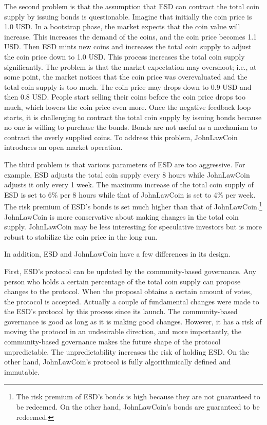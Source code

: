 \documentclass[dvipdfmx,a4paper]{article}
\begin{document}
The second problem is that the assumption that ESD can contract the total coin supply by issuing bonds is questionable. Imagine that initially the coin price is 1.0 USD. In a bootstrap phase, the market expects that the coin value will increase. This increases the demand of the coins, and the coin price becomes 1.1 USD. Then ESD mints new coins and increases the total coin supply to adjust the coin price down to 1.0 USD. This process increases the total coin supply significantly. The problem is that the market expectation may overshoot; i.e., at some point, the market notices that the coin price was overevaluated and the total coin supply is too much. The coin price may drops down to 0.9 USD and then 0.8 USD. People start selling their coins before the coin price drops too much, which lowers the coin price even more. Once the negative feedback loop starts, it is challenging to contract the total coin supply by issuing bonds because no one is willing to purchase the bonds. Bonds are not useful as a mechanism to contract the overly supplied coins. To address this problem, JohnLawCoin introduces an open market operation.

The third problem is that various parameters of ESD are too aggressive. For example, ESD adjusts the total coin supply every 8 hours while JohnLawCoin adjusts it only every 1 week. The maximum increase of the total coin supply of ESD is set to 6\% per 8 hours while that of JohnLawCoin is set to 4\% per week. The risk premium of ESD's bonds is set much higher than that of JohnLawCoin.\footnote{The risk premium of ESD's bonds is high because they are not guaranteed to be redeemed. On the other hand, JohnLawCoin's bonds are guaranteed to be redeemed.} JohnLawCoin is more conservative about making changes in the total coin supply. JohnLawCoin may be less interesting for speculative investors but is more robust to stabilize the coin price in the long run.

In addition, ESD and JohnLawCoin have a few differences in its design.

First, ESD's protocol can be updated by the community-based governance. Any person who holds a certain percentage of the total coin supply can propose changes to the protocol. When the proposal obtains a certain amount of votes, the protocol is accepted. Actually a couple of fundamental changes were made to the ESD's protocol by this process since its launch. The community-based governance is good as long as it is making good changes. However, it has a risk of moving the protocol in an undesirable direction, and more importantly, the community-based governance makes the future shape of the protocol unpredictable. The unpredictability increases the risk of holding ESD. On the other hand, JohnLawCoin's protocol is fully algorithmically defined and immutable.
\end{document}
